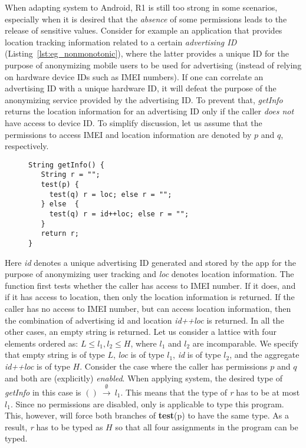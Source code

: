 When adapting {\BN} system to Android, R1
is still too strong in some scenarios, especially when it is desired that the \emph{absence} of some permissions
leads to the release of sensitive values. Consider for example an application
that provides location tracking information related to a certain
{\em advertising ID} (Listing~\ref{lst:eg_nonmonotonic}), where the latter provides a unique ID for the purpose of anonymizing mobile users
to be used for advertising (instead of relying on hardware device IDs such
as IMEI numbers). If one can correlate an advertising
ID with a unique hardware ID, it will defeat the purpose of
the anonymizing service provided by the advertising ID. To prevent
that, \textit{getInfo} returns the location information for an advertising ID
only if the caller \emph{does not} have access to device ID.
To simplify discussion, let us assume that the permissions to access
IMEI and location information are denoted by $p$ and $q$, respectively.
\begin{figure}[ht]
\begin{lstlisting}[caption={An example about non-monotonic policy.}, label={lst:eg_nonmonotonic}]
String getInfo() {
   String r = "";
   test(p) {
     test(q) r = loc; else r = "";
   } else  {
     test(q) r = id++loc; else r = "";
   }
   return r;
}
\end{lstlisting}
\end{figure}
Here \textit{id} denotes a unique advertising ID  generated and stored by the app for
the purpose of anonymizing user tracking and \textit{loc} denotes location
information.
The function first tests whether the caller has access to IMEI number.
If it does, and if it has access to location, then only the location information is returned.
If the caller has no access to IMEI number, but can access location information,
then the combination of advertising id and location \textit{id++loc} is returned.
In all the other cases, an empty string is returned.
Let us consider a lattice with four elements ordered as:
$L \leq l_1, l_2 \leq H$, where $l_1$ and $l_2$ are incomparable. We specify that empty string is of type $L$, \textit{loc} is of type $l_1$,
\textit{id} is of type $l_2$, and the aggregate \textit{id++loc} is of type $H.$
Consider the case where the caller has permissions $p$ and $q$ and both are (explicitly) \emph{enabled}.
When applying {\BN} system, the desired type of \textit{getInfo} in this case is  $()~{\xrightarrow{~\emptyset~}}~l_1$.
This means that the type of \textit{r} has to be at most $l_1$.
Since no permissions are disabled, only  is applicable
to type this program. This, however, will force both branches of \textbf{test}(p)
to have the same type. As a result, \textit{r}
has to be typed as $H$ so that all four assignments in the program
can be typed.

